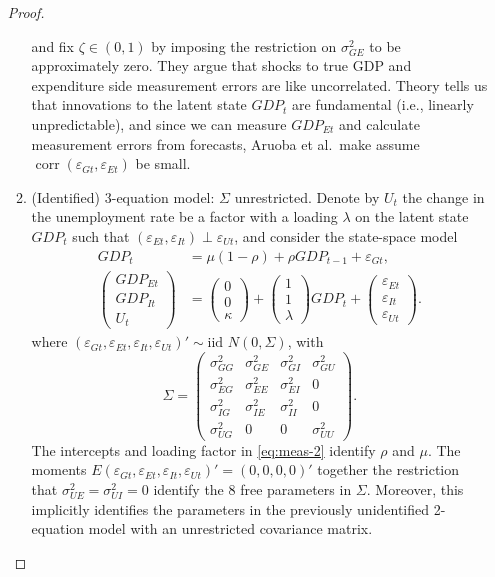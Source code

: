 \documentclass[oneside,reqno]{amsart}
\DeclareMathOperator{\corr}{corr}
\newcommand{\eps}{\varepsilon}
\theoremstyle{definition}
\begin{document}
\begin{enumerate}[label=(\roman*)]
\begin{proof}
\begin{enumerate}[label=(\arabic*)]
\[\]
and fix $\zeta \in (0,1)$ by imposing the restriction on $\sigma_{GE}^2$ to be approximately zero. They argue that  shocks to true GDP and expenditure side measurement errors are like uncorrelated. Theory tells us that innovations to the latent state $GDP_t$ are fundamental (i.e., linearly unpredictable), and since we can measure $GDP_{Et}$ and calculate measurement errors from forecasts, Aruoba et al.\ make assume $\corr(\eps_{ Gt}, \eps_{Et})$ be small. 
\item
(Identified) 3-equation model: $\Sigma$ unrestricted. Denote by $U_t$ the change in the unemployment rate be a factor with a loading $\lambda$ on the latent state $GDP_t$ such that $(\eps_{Et}, \eps_{It}) \perp \eps_{Ut}$, and consider the state-space model  
\begin{align}
	GDP_t &= \mu(1-\rho) + \rho GDP_{t-1} + \eps_{Gt}, \label{eq:state-2} \\
	\begin{pmatrix}
		GDP_{Et}  \\ GDP_{It} \\ U_t
	\end{pmatrix} 
	&= \begin{pmatrix}
		0 \\ 0 \\ \kappa
	\end{pmatrix} 
	+ \begin{pmatrix}
		1 \\ 1 \\ \lambda		
	\end{pmatrix} GDP_t
	+ \begin{pmatrix}
		\eps_{Et} \\ \eps_{It} \\ \eps_{Ut}
	\end{pmatrix}  \label{eq:meas-2}.
\end{align}
where $(\eps_{Gt}, \eps_{Et}, \eps_{It}, \eps_{Ut})' \sim \text{iid } N(0, \Sigma)$, with 
\begin{equation}
	\Sigma = \begin{pmatrix}
		\sigma_{GG}^2&\sigma_{GE}^2 &\sigma_{GI}^2&\sigma_{GU}^2 \\
		\sigma_{EG}^2 & \sigma_{EE}^2 & \sigma_{EI}^2 & 0\\
		\sigma_{IG}^2 & \sigma_{IE}^2 &  \sigma_{II}^2 & 0\\
		\sigma_{UG}^2 & 0 & 0 & \sigma_{UU}^2
	\end{pmatrix}.
\end{equation}
The intercepts and loading factor in \eqref{eq:meas-2}  identify $\rho$ and $\mu$. The moments $E(\eps_{Gt}, \eps_{Et}, \eps_{It}, \eps_{Ut})' = (0,0,0,0)'$  together the restriction that $\sigma_{UE}^2 = \sigma_{UI}^2 = 0$ identify the 8 free parameters in $\Sigma$. Moreover, this implicitly identifies the parameters in the previously unidentified 2-equation model with an unrestricted covariance matrix.

\end{enumerate}
\end{proof}
\end{enumerate}
\end{document}
